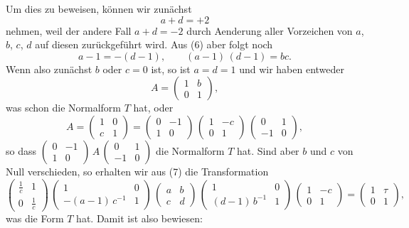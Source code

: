 \documentclass[12pt,a4paper]{article}
\begin{document}
Um dies zu beweisen, können wir zunächst
\begin{equation}\label{eq:68.6}
\tag{6}
a + d = +2
\end{equation}
nehmen, weil der andere Fall $a + d = -2$ durch Aenderung aller Vorzeichen von $a$, $b$, $c$, $d$ auf diesen zurückgeführt wird. Aus (6) aber folgt noch
\begin{equation}\label{eq:68.7}
\tag{7}
a - 1 = -(d - 1),\qquad (a - 1)\,(d - 1) = bc.
\end{equation}
Wenn also zunächst $b$ oder $c = 0$ ist, so ist $a = d = 1$ und wir haben entweder
\begin{equation}\label{eq:68.8}
\tag{8}
A = \begin{pmatrix}1&b\\0&1\end{pmatrix},
\end{equation}
was schon die Normalform $T$ hat, oder
\[
A = \begin{pmatrix}1&0\\c&1\end{pmatrix}
= \begin{pmatrix}0&-1\\1&0\end{pmatrix}\,
\begin{pmatrix}1&-c\\0&1\end{pmatrix}\,
\begin{pmatrix}0&1\\-1&0\end{pmatrix},
\]
so dass $\begin{pmatrix}0&-1\\1&0\end{pmatrix}\,A\,\begin{pmatrix}0&1\\-1&0\end{pmatrix}$ die Normalform $T$ hat. Sind aber $b$ und $c$ von Null verschieden, so erhalten wir aus (7) die Transformation
\[
\begin{pmatrix}\frac{1}{c}&1\\0&\frac{1}{c}\end{pmatrix}\,
\begin{pmatrix}1&0\\-(a-1)\,c^{-1}&1\end{pmatrix}\,
\begin{pmatrix}a&b\\c&d\end{pmatrix}\,
\begin{pmatrix}1&0\\(d-1)\,b^{-1}&1\end{pmatrix}\,
\begin{pmatrix}1&-c\\0&1\end{pmatrix}
= \begin{pmatrix}1&\tau\\0&1\end{pmatrix},
\]
was die Form $T$ hat. Damit ist also bewiesen:
\end{document}
